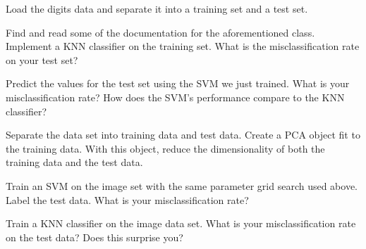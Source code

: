 
Load the digits data and separate it into a training set and a test set.

Find and read some of the documentation for the aforementioned class. Implement a KNN classifier on the training set. What is the misclassification rate on your test set?

Predict the values for the test set using the SVM we just trained. What is your misclassification rate? How does the SVM's performance compare to the KNN classifier?

Separate the data set into training data and test data. Create a PCA object fit to the training data. With this object, reduce the dimensionality of both the training data and the test data.

Train an SVM on the image set with the same parameter grid search used above. Label the test data. What is your misclassification rate?

Train a KNN classifier on the image data set. What is your misclassification rate on the test data? Does this surprise you?
